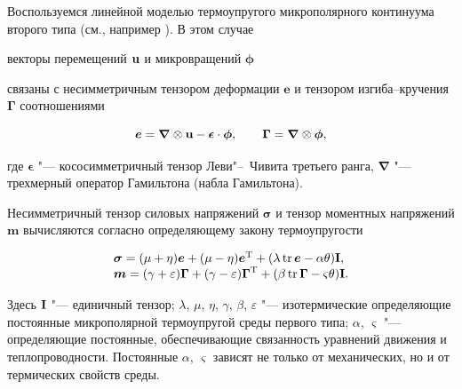 
Воспользуемся линейной моделью термоупругого микрополярного континуума второго типа (см., например \cite{MurashkinRadayev:bib:WPinFTandTM, MurashkinRadayev:bib:GreenNaghdi1993}). В этом случае

векторы перемещений ${\bf u}$ и микровращений ${\boldsymbol\phi}$

связаны с  несимметричным тензором деформации $ \boldsymbol{e}$ и тензором изгиба--кручения $\boldsymbol{\Gamma}$  соотношениями

\begin{equation}

\label{deform}

\boldsymbol{e}=\boldsymbol{\nabla} \otimes \bf{u} -  \boldsymbol{\epsilon} \cdot\boldsymbol{\phi}, \qquad

\boldsymbol{\Gamma}=\boldsymbol{\nabla} \otimes \boldsymbol{\phi},

\end{equation}

где $\boldsymbol{\epsilon}$ "--- кососимметричный тензор Леви"--~Чивита третьего ранга, ${\boldsymbol\nabla}$ "--- трехмерный оператор Гамильтона (набла Гамильтона).



Несимметричный тензор силовых напряжений $\boldsymbol{\sigma}$ и тензор моментных напряжений ${\boldsymbol m}$ вычисляются согласно  определяющему закону термоупругости

\begin{equation}

\begin{array}{l}

{\boldsymbol{\sigma}}= (\mu+\eta)\boldsymbol{e}+ (\mu-\eta)\boldsymbol{e}^{\rm T}+(\lambda \mathop{\rm tr} \boldsymbol{e}-\alpha \theta)\bf{I}, \\

{\boldsymbol{m}}= (\gamma+\varepsilon){\boldsymbol\Gamma}+ (\gamma-\varepsilon)\boldsymbol{\Gamma}^{\rm T}+(\beta \mathop{\rm tr} \boldsymbol{\Gamma}-\varsigma \theta)\bf{I}.

 \end{array}

\label{LawCTE}

\end{equation}

Здесь $\bf{I}$ "--- единичный тензор; $\lambda$, $\mu$, $\eta$, $\gamma$, $\beta$, $\varepsilon$ "--- изотермические определяющие  постоянные микрополярной термоупругой среды первого типа; $\alpha$, $\varsigma$  "--- определяющие постоянные, обеспечивающие связанность уравнений движения и теплопроводности. Постоянные $\alpha$, $\varsigma$ зависят не только от механических, но и от термических свойств среды.




